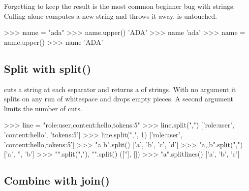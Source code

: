 \begin{trap}
Forgetting to keep the result is the most common beginner bug with strings. Calling
 alone computes a new string and throws it away.  is untouched.
\begin{center}
\end{center}
\begin{pycode}
>>> name = "ada"
>>> name.upper()
'ADA'
>>> name
'ada'
>>> name = name.upper()
>>> name
'ADA'
\end{pycode}
\end{trap}

\subsection{Split with split()}

 cuts a string at each separator and returns a  of strings. With no
argument it splits on any run of whitespace and drops empty pieces. A second argument limits the
number of cuts.

\begin{pycode}
>>> line = "role:user,content:hello,tokens:5"
>>> line.split(",")
['role:user', 'content:hello', 'tokens:5']
>>> line.split(",", 1)
['role:user', 'content:hello,tokens:5']
>>> "a  b\tc\nd".split()
['a', 'b', 'c', 'd']
>>> "a,,b".split(",")
['a', '', 'b']
>>> "".split(","), "".split()
([''], [])
>>> "a\nb\nc".splitlines()
['a', 'b', 'c']
\end{pycode}

\subsection{Combine with join()}

